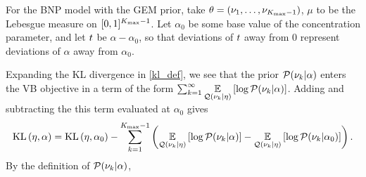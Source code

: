 \begin{ex}
%
For the BNP model with the GEM prior, take $\theta = (\nu_1, \ldots,
\nu_{{K_{\mathrm{max}}}-1})$, $\mu$ to be the Lebesgue measure on $[0,1]^{{K_{\mathrm{max}}}-1}$.
Let $\alpha_0$ be some base value of the concentration parameter, and
let $t$ be $\alpha - \alpha_0$, so that deviations of $t$ away from
$0$ represent deviations of $\alpha$ away from $\alpha_0$.

Expanding the KL divergence in \eqref{kl_def}, we see that the prior
$\mathcal{P}(\nu_{k} \vert \alpha)$ enters the VB objective in a term of the form
$\sum_{k=1}^\infty \underset{\mathcal{Q}(\nu_{k} \vert \eta)}{\mathbb{E}}\left[\log \mathcal{P}(\nu_{k} \vert \alpha)\right]$.
Adding and subtracting the this term evaluated at $\alpha_0$ gives
%
\begin{align*}
%
\KL{\eta, \alpha} = \KL{\eta, \alpha_0}
-\sum_{\k=1}^{\kmax - 1}
            \left(
                \expect{\q(\nuk \vert \eta)}{\log \p(\nuk \vert \alpha)} -
                \expect{\q(\nuk \vert \eta)}{\log \p(\nuk \vert \alpha_0)}
             \right).
%
\end{align*}
%
By the definition of $\mathcal{P}(\nu_{k} \vert \alpha)$,
%
\begin{align*}

\end{align*}
\end{ex}
